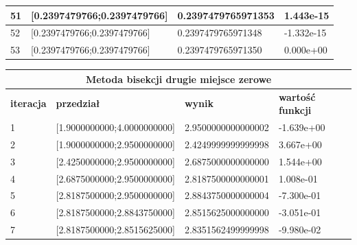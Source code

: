 \documentclass[a4paper, 11pt]{article}
\begin{document}
\begin{table}[H]
\begin{tabular}{llll}
\multicolumn{1}{|l|}{51} & \multicolumn{1}{l|}{{[}0.2397479766;0.2397479766{]}} & \multicolumn{1}{l|}{0.2397479765971353} & \multicolumn{1}{l|}{1.443e-15} \\ \hline
\multicolumn{1}{|l|}{52} & \multicolumn{1}{l|}{{[}0.2397479766;0.2397479766{]}} & \multicolumn{1}{l|}{0.2397479765971348} & \multicolumn{1}{l|}{-1.332e-15} \\ \hline
\multicolumn{1}{|l|}{53} & \multicolumn{1}{l|}{{[}0.2397479766;0.2397479766{]}} & \multicolumn{1}{l|}{0.2397479765971350} & \multicolumn{1}{l|}{0.000e+00} \\ \hline
\end{tabular}
\end{table}

\begin{table}[H]
\centering
\label{my-label}
\begin{tabular}{llll}
\hline
\multicolumn{4}{c}{\textbf{Metoda bisekcji drugie miejsce zerowe}} \\ \hline
\multicolumn{1}{|l|}{\textbf{iteracja}} & \multicolumn{1}{l|}{\textbf{przedział}} & \multicolumn{1}{l|}{\textbf{wynik}} & \multicolumn{1}{l|}{\textbf{wartość funkcji}} \\ \hline
\multicolumn{1}{|l|}{1} & \multicolumn{1}{l|}{{[}1.9000000000;4.0000000000{]}} & \multicolumn{1}{l|}{2.9500000000000002} & \multicolumn{1}{l|}{-1.639e+00} \\ \hline
\multicolumn{1}{|l|}{2} & \multicolumn{1}{l|}{{[}1.9000000000;2.9500000000{]}} & \multicolumn{1}{l|}{2.4249999999999998} & \multicolumn{1}{l|}{3.667e+00} \\ \hline
\multicolumn{1}{|l|}{3} & \multicolumn{1}{l|}{{[}2.4250000000;2.9500000000{]}} & \multicolumn{1}{l|}{2.6875000000000000} & \multicolumn{1}{l|}{1.544e+00} \\ \hline
\multicolumn{1}{|l|}{4} & \multicolumn{1}{l|}{{[}2.6875000000;2.9500000000{]}} & \multicolumn{1}{l|}{2.8187500000000001} & \multicolumn{1}{l|}{1.008e-01} \\ \hline
\multicolumn{1}{|l|}{5} & \multicolumn{1}{l|}{{[}2.8187500000;2.9500000000{]}} & \multicolumn{1}{l|}{2.8843750000000004} & \multicolumn{1}{l|}{-7.300e-01} \\ \hline
\multicolumn{1}{|l|}{6} & \multicolumn{1}{l|}{{[}2.8187500000;2.8843750000{]}} & \multicolumn{1}{l|}{2.8515625000000000} & \multicolumn{1}{l|}{-3.051e-01} \\ \hline
\multicolumn{1}{|l|}{7} & \multicolumn{1}{l|}{{[}2.8187500000;2.8515625000{]}} & \multicolumn{1}{l|}{2.8351562499999998} & \multicolumn{1}{l|}{-9.980e-02} \\ \hline

\end{tabular}
\end{table}
\end{document}
